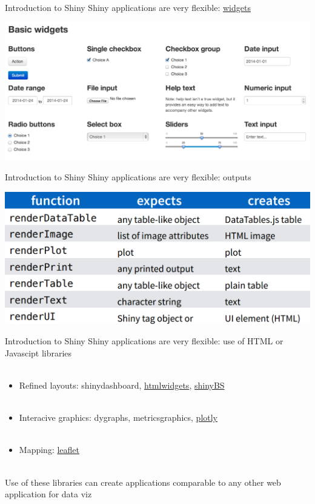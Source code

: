 \documentclass[serif]{beamer}\usepackage[]{graphicx}\usepackage[]{color}
\begin{document}
\begin{frame}[t]{Introduction to Shiny}
Shiny applications are very flexible: \href{http://shiny.rstudio.com/gallery/widget-gallery.html}{widgets}
\begin{center}
\includegraphics[width = \textwidth]{fig/widgets.png}
\end{center}
\end{frame}

\begin{frame}[t]{Introduction to Shiny}
Shiny applications are very flexible: outputs
\begin{center}
\includegraphics[width = \textwidth]{fig/outputs.png}
\end{center}
\end{frame}

\begin{frame}[t]{Introduction to Shiny}
Shiny applications are very flexible: use of HTML or Javascipt libraries \\~\\
\begin{itemize}
\item Refined layouts: shinydashboard, \href{http://www.htmlwidgets.org/}{htmlwidgets}, \href{https://ebailey78.github.io/shinyBS/}{shinyBS} \\~\\
\item Interacive graphics: dygraphs, metricsgraphics, \href{https://plot.ly/r/shiny-tutorial/}{plotly} \\~\\
\item Mapping: \href{https://rstudio.github.io/leaflet/}{leaflet} \\~\\
\end{itemize}
Use of these libraries can create applications comparable to any other web application for data viz
\end{frame}
\end{document}
